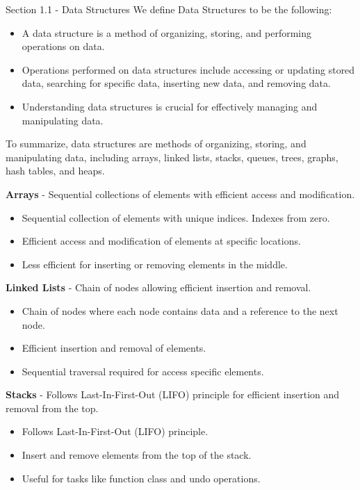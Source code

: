 \begin{notes}{Section 1.1 - Data Structures}
    We define Data Structures to be the following:

    \begin{itemize}
        \item A data structure is a method of organizing, storing, and performing operations on data.
        \item Operations performed on data structures include accessing or updating stored data, searching for specific data, inserting new data, and removing data.
        \item Understanding data structures is crucial for effectively managing and manipulating data.
    \end{itemize}
    To summarize, data structures are methods of organizing, storing, and manipulating data, including arrays, linked lists, stacks, queues, trees, graphs, hash tables,
    and heaps.

    \begin{highlight}[Arrays]
        \textbf{Arrays} - Sequential collections of elements with efficient access and modification.
        \begin{itemize}
            \item Sequential collection of elements with unique indices. Indexes from zero.
            \item Efficient access and modification of elements at specific locations.
            \item Less efficient for inserting or removing elements in the middle.
        \end{itemize}
    \end{highlight}

    \begin{highlight}
        \textbf{Linked Lists} - Chain of nodes allowing efficient insertion and removal.
        \begin{itemize}
            \item Chain of nodes where each node contains data and a reference to the next node.
            \item Efficient insertion and removal of elements.
            \item Sequential traversal required for access specific elements.
        \end{itemize}
    \end{highlight}

    \begin{highlight}[Stacks]
        \textbf{Stacks} - Follows Last-In-First-Out (LIFO) principle for efficient insertion and removal from the top.
        \begin{itemize}
            \item Follows Last-In-First-Out (LIFO) principle.
            \item Insert and remove elements from the top of the stack.
            \item Useful for tasks like function class and undo operations.
        \end{itemize}
    \end{highlight}


\end{notes}
